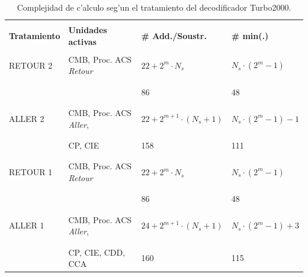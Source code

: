 \begin{table}[H]
	\begin{center}
	\begin{threeparttable}
	\begin{tabular}{ | l || l | l | l |}
		\hline
		& & & \\[-18pt]
		\textbf{Tratamiento}		&	\textbf{Unidades activas}		&	\textbf{\# Add./Soustr.}	&	\textbf{\# min(.)}	\\[3pt]
		\hline \hline
		& & &\\[-18pt]RETOUR 2	&	CMB, Proc. ACS \emph{Retour}&	$22+2^m \cdot N_s$			& $N_s \cdot (2^m-1)$\\& & &\\[-18pt]
		& & &\\[-18pt]			&						&	86						& 48\\& & &\\[-18pt]\hline
		& & &\\[-18pt]ALLER 2		&	CMB, Proc. ACS \emph{Aller},&	$22+2^{m+1} \cdot (N_s+1)$	& $N_s \cdot (2^m-1)-1$\\& & &\\[-18pt]
		& & &\\[-18pt]			&	CP, CIE				&	158						& 111\\& & &\\[-18pt]\hline
		& & &\\[-18pt]RETOUR 1	&	CMB, Proc. ACS \emph{Retour}&	$22+2^m \cdot N_s$			& $N_s \cdot (2^m-1)$\\& & &\\[-18pt]
		& & &\\[-18pt]			&						&	86						& 48\\& & &\\[-18pt]\hline
		& & &\\[-18pt]ALLER 1		&	CMB, Proc. ACS \emph{Aller},&	$24+2^{m+1} \cdot (N_s+1)$	& $N_s \cdot (2^m-1)+3$\\& & &\\[-18pt]
		& & &\\[-18pt]			&	CP, CIE, CDD, CCA			&	160						& 115\\[3pt]
		\hline
	\end{tabular}
	\end{threeparttable}
	\end{center}
	\caption{Complejidad de c'alculo seg'un el tratamiento del decodificador Turbo2000.}
\end{table}

